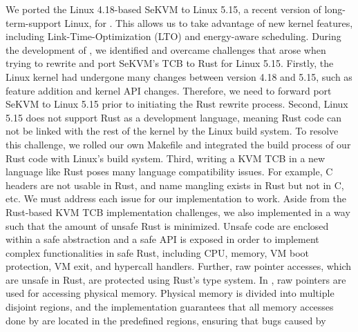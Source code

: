 We ported the Linux 4.18-based SeKVM to Linux 5.15, a recent version of
long-term-support Linux, for \rustsec{}. This allows us to take advantage of
new kernel features, including Link-Time-Optimization (LTO) and energy-aware
scheduling.
During the development of \rustsec{}, we identified and overcame challenges
that arose when trying to rewrite and port SeKVM's TCB to Rust for Linux 5.15.
Firstly, the Linux kernel had undergone many changes between version 4.18 and
5.15, such as feature addition and kernel API changes. Therefore, we need to
forward port SeKVM to Linux 5.15 prior to initiating the Rust rewrite process.
Second, Linux 5.15 does not support Rust as a development language, meaning
Rust code can not be linked with the rest of the kernel by the Linux build
system. To resolve this challenge, we rolled our own Makefile and integrated
the build process of our Rust code with Linux's build system.
Third, writing a KVM TCB in a new language like Rust poses many language
compatibility issues. For example, C headers are not usable in Rust, and name
mangling exists in Rust but not in C, etc. We must address each issue  for our
implementation to work.
Aside from the Rust-based KVM TCB implementation challenges, we also
implemented \rustcore{} in a way such that the amount of unsafe Rust is
minimized.
Unsafe code are enclosed within a safe abstraction and a safe API is exposed
in order to implement complex functionalities in safe Rust, including CPU,
memory, VM boot protection, VM exit, and hypercall handlers.
Further, raw pointer accesses, which are unsafe in Rust, are protected using
Rust’s type system. In \rustcore{}, raw pointers are used for accessing
physical memory. Physical memory is divided into multiple disjoint regions,
and the \rustcore{} implementation guarantees that all memory accesses done by
\rustcore{} are located in the predefined regions, ensuring that bugs caused by

